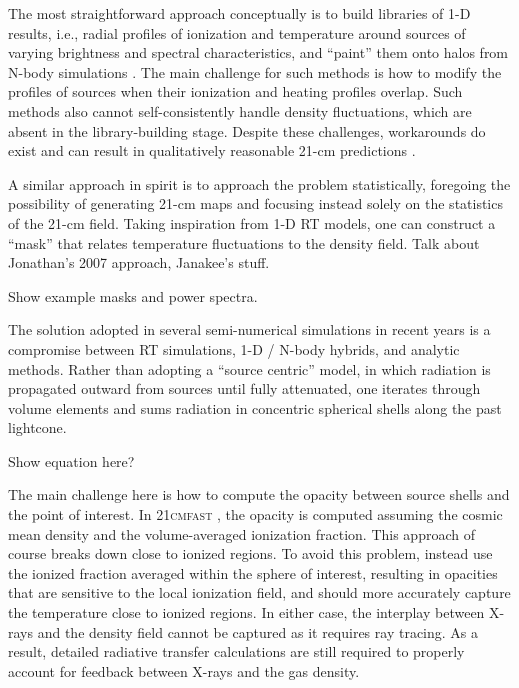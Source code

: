 The most straightforward approach conceptually is to build libraries of 1-D results, i.e., radial profiles of ionization and temperature around sources of varying brightness and spectral characteristics, and ``paint'' them onto halos from N-body simulations \cite{Thomas2009}. The main challenge for such methods is how to modify the profiles of sources when their ionization and heating profiles overlap. Such methods also cannot self-consistently handle density fluctuations, which are absent in the library-building stage. Despite these challenges, workarounds do exist and can result in qualitatively reasonable 21-cm predictions \cite{Thomas2009}. 

A similar approach in spirit is to approach the problem statistically, foregoing the possibility of generating 21-cm maps and focusing instead solely on the statistics of the 21-cm field. Taking inspiration from 1-D RT models, one can construct a ``mask'' that relates temperature fluctuations to the density field. {\color{red} Talk about Jonathan's 2007 approach, Janakee's stuff.}

{\color{red} Show example masks and power spectra.}

The solution adopted in several semi-numerical simulations in recent years is a compromise between RT simulations, 1-D / N-body hybrids, and analytic methods. Rather than adopting a ``source centric'' model, in which radiation is propagated outward from sources until fully attenuated, one iterates through volume elements and sums radiation in concentric spherical shells along the past lightcone. 

{\color{red} Show equation here?}

The main challenge here is how to compute the opacity between source shells and the point of interest. In \textsc{21cmfast} \cite{Mesinger2011}, the opacity is computed assuming the cosmic mean density and the volume-averaged ionization fraction. This approach of course breaks down close to ionized regions. To avoid this problem, \cite{Fialkov2015} instead use the ionized fraction averaged within the sphere of interest, resulting in opacities that are sensitive to the local ionization field, and should more accurately capture the temperature close to ionized regions. In either case, the interplay between X-rays and the density field cannot be captured as it requires ray tracing. As a result, detailed radiative transfer calculations are still required to properly account for feedback between X-rays and the gas density. 

